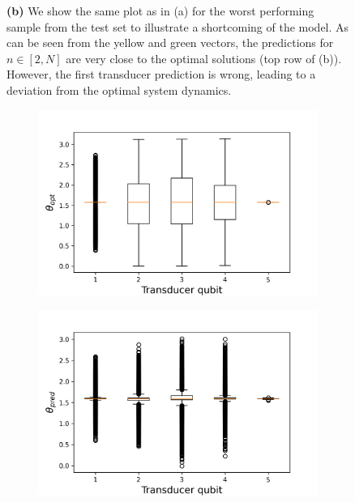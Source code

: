 \begin{figure}[H]
{		\textbf{(b)} We show the same plot as in (a) for the worst performing sample from the test set to illustrate a shortcoming of the model. As can be seen from the yellow and green vectors, the predictions for $n \in [2, N]$ are very close to the optimal solutions (top row of (b)). However, the first transducer prediction is wrong, leading to a deviation from the optimal system dynamics.}
	\label{n_5_blochs}
\end{figure}

\begin{figure}[h]
	\centering
	\begin{subfigure}{0.45\textwidth}
		\centering
		\includegraphics[width=\textwidth]{img/theta_opt_box2}
	\end{subfigure}
	\begin{subfigure}{0.45\textwidth}
		\centering
		\includegraphics[width=\textwidth]{img/theta_pred_box2}

\end{subfigure}
\end{figure}
